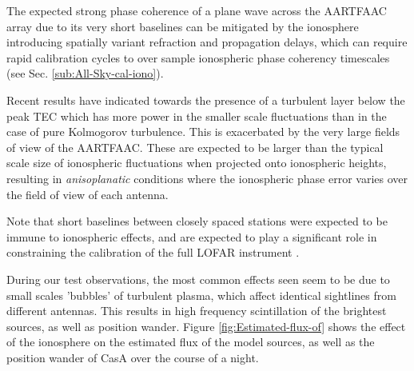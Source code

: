 \documentclass{aa}
\begin{document}
The expected  strong phase coherence of  a plane wave across  the AARTFAAC array
due to its  very short baselines can be mitigated  by the ionosphere introducing
spatially  variant refraction and  propagation delays,  which can  require rapid
calibration cycles  to over sample  ionospheric phase coherency  timescales (see
Sec. \ref{sub:All-Sky-cal-iono}).

Recent results \citep{intema2009ionospheric} have indicated towards the presence
of a  turbulent layer below  the peak  TEC which has  more power in  the smaller
scale  fluctuations than in  the case  of pure  Kolmogorov turbulence.   This is
exacerbated by the very large fields  of view of the \mbox{AARTFAAC}.  These are
expected to  be larger than the  typical scale size  of ionospheric fluctuations
when  projected  onto  ionospheric  heights,  resulting  in  \emph{anisoplanatic
}conditions where the  ionospheric phase error varies over the  field of view of
each antenna.

Note that  short baselines between closely  spaced stations were  expected to be
immune to  ionospheric effects, and are  expected to play a  significant role in
constraining    the     calibration    of    the     full    LOFAR    instrument
\citep{vdTol2007selfcallofar}.

During our  test observations, the  most common effects  seen seem to be  due to
small scales  'bubbles' of turbulent  plasma, which affect  identical sightlines
from different antennas.   This results in high frequency  scintillation of the
brightest     sources,     as    well     as     position    wander.      Figure
\ref{fig:Estimated-flux-of} shows the effect  of the ionosphere on the estimated
flux of  the model  sources, as  well as the  position wander  of CasA  over the
course of a night.
\end{document}
